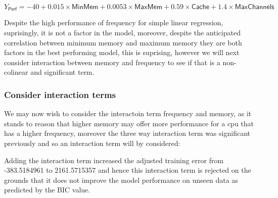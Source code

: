 \documentclass[12pt]{article}
\newenvironment{Shaded}{\begin{snugshade}}{\end{snugshade}}
\newcommand{\CommentTok}[1]{\textcolor[rgb]{0.56,0.35,0.01}{\textit{#1}}}
\newcommand{\DataTypeTok}[1]{\textcolor[rgb]{0.13,0.29,0.53}{#1}}
\newcommand{\DecValTok}[1]{\textcolor[rgb]{0.00,0.00,0.81}{#1}}
\newcommand{\KeywordTok}[1]{\textcolor[rgb]{0.13,0.29,0.53}{\textbf{#1}}}
\newcommand{\NormalTok}[1]{#1}
\newcommand{\OperatorTok}[1]{\textcolor[rgb]{0.81,0.36,0.00}{\textbf{#1}}}
\newcommand{\StringTok}[1]{\textcolor[rgb]{0.31,0.60,0.02}{#1}}
\begin{document}
\[
Y_{\textsf{Perf}} = -40 + 0.015\times \textsf{MinMem}  + 0.0053 \times \textsf{MaxMem} + 0.59\times \textsf{Cache} + 1.4\times \textsf{MaxChannels}
\]

Despite the high performance of frequency for simple linear regression,
suprisingly, it is not a factor in the model, moreover, despite the
anticipated correlation between minimum memory and maximum memory they
are both factors in the best performing model, this is suprising,
however we will next consider interaction between memory and frequency
to see if that is a non-colinear and significant term.

\hypertarget{consider-interaction-terms}{%
\subsubsection{Consider interaction
terms}\label{consider-interaction-terms}}

We may now wish to consider the interactoin term frequency and memory,
as it stands to reason that higher memory may offer more performance for
a cpu that has a higher frequency, moreover the three way interaction
term was significant previously and so an interaction term will by
considered:

\begin{Shaded}
\end{Shaded}

Adding the interaction term increased the adjusted training error from
-383.5184961 to 2161.5715357 and hence this interaction term is rejected
on the grounds that it does not improve the model performance on unseen
data as predicted by the BIC value.
\end{document}
